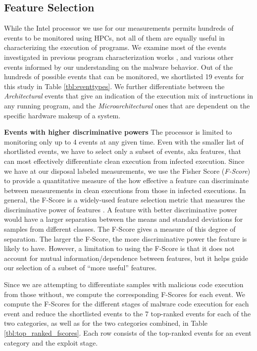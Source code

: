 \documentclass{acm_proc_article-sp}
\begin{document}
\subsection{Feature Selection}

While the Intel processor we use for our measurements permits hundreds
of events to be monitored using HPCs, not all of them 
are equally useful in characterizing the execution of programs. We 
examine most of the events investigated in previous program 
characterization works \cite{Shen:2008:HCD:1346281.1346306, Hoste:2012}, 
and various other events informed by our understanding on the malware behavior. 
Out of the hundreds of possible events that can be 
monitored, we shortlisted  19 events for this study in Table 
\ref{tbl:eventtypes}. We further differentiate between the \textit{Architectural} 
events that give an indication of the execution mix of instructions in any running program, 
and the \textit{Microarchitectural} ones that are dependent on
the specific hardware makeup of a system.

\textbf{Events with higher discriminative powers} \space\space The 
processor is limited to monitoring only up to 4 events at any given time. 
Even with the smaller list of shortlisted events, we have to select 
only a subset of events, aka features, that can most effectively 
differentiate clean execution from infected execution. Since we 
have at our disposal labeled measurements, we use the
Fisher Score (\emph{F-Score}) to provide a quantitative measure of
the how effective a feature can discriminate between measurements 
in clean executions from those in infected executions. In general, the 
F-Score is a widely-used feature selection metric that measures the 
discriminative power of features \cite{2007:RDP:1325591.1325635}. 
A feature with better discriminative power would have a larger separation between the means and standard
deviations for samples from different classes. The F-Score gives a
measure of this degree of separation. The larger the F-Score, the
more discriminative power the feature is likely to have. However,
a limitation to using the F-Score is that it does not account for
mutual information/dependence between features, but it helps guide
our selection of a subset of ``more useful'' features.

Since we are attempting to differentiate samples with malicious
code execution from those without, we compute the corresponding F-Scores 
for each event. We compute the F-Scores for the different stages
of malware code execution for each event and reduce the
shortlisted events to the 7 top-ranked events for each of the two
categories, as well as for the two categories combined, in Table 
\ref{tbl:top_ranked_fscores}. Each row consists of the top-ranked
events for an event category and the exploit stage.
\end{document}
